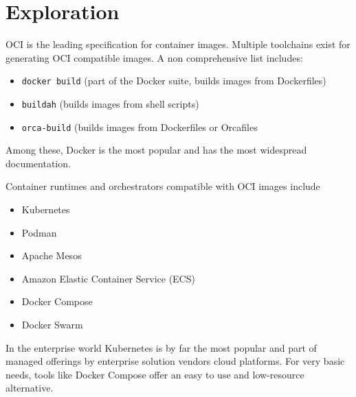 \documentclass[12pt, letterpaper, twoside]{article}
\begin{document}
\section{Exploration}
\label{sec:explore}

OCI is the leading specification for container images. Multiple toolchains exist for generating OCI compatible images. A non comprehensive list includes:
\begin{itemize}
    \item \verb|docker build| (part of the Docker suite, builds images from Dockerfiles)
    \item \verb|buildah| (builds images from shell scripts)
    \item \verb|orca-build| (builds images from Dockerfiles or Orcafiles
\end{itemize}
Among these, Docker is the most popular and has the most widespread documentation.

Container runtimes and orchestrators compatible with OCI images include
\begin{itemize}
    \item Kubernetes
    \item Podman
    \item Apache Mesos
    \item Amazon Elastic Container Service (ECS)
    \item Docker Compose
    \item Docker Swarm
\end{itemize}
In the enterprise world Kubernetes is by far the most popular and part of managed offerings by enterprise solution vendors cloud platforms. For very basic needs, tools like Docker Compose offer an easy to use and low-resource alternative.
\end{document}
